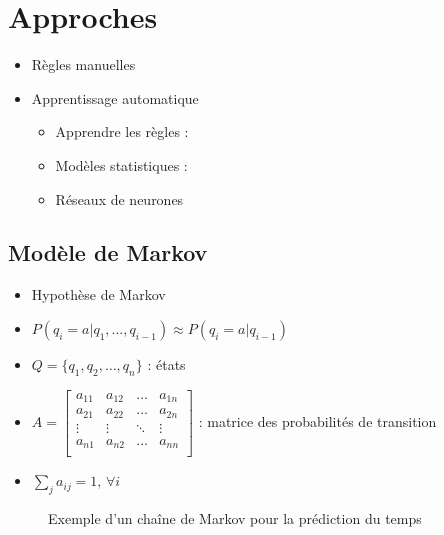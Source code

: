 \documentclass{KodeBook}
\begin{document}
\section{Approches}

\begin{itemize}
	\item Règles manuelles 
	\item Apprentissage automatique 
	\begin{itemize}
		\item Apprendre les règles : 
		\item Modèles statistiques : 
		\item Réseaux de neurones
	\end{itemize}
\end{itemize}

\subsection{Modèle de Markov}

\begin{minipage}{.64\textwidth}
	\begin{itemize}
		\item Hypothèse de Markov
		\item $ P(q_i = a | q_1, \ldots, q_{i-1}) \approx P(q_i = a | q_{i-1}) $
		\item $Q = \{q_1, q_2, \ldots, q_n\}$ : états
		\item $A = \begin{bmatrix}%
		a_{11} & a_{12} & \ldots & a_{1n} \\
		a_{21} & a_{22} & \ldots & a_{2n} \\
		\vdots & \vdots & \ddots & \vdots \\
		a_{n1} & a_{n2} & \ldots & a_{nn} \\
		\end{bmatrix}$ : matrice des probabilités de transition
		\item $\sum_j a_{ij} = 1,\, \forall i$
	\end{itemize}
\end{minipage}
\begin{figure}
	\caption{Exemple d'un chaîne de Markov pour la prédiction du temps \cite{2019-jurafsky-martin}}
\end{figure}
\end{document}
